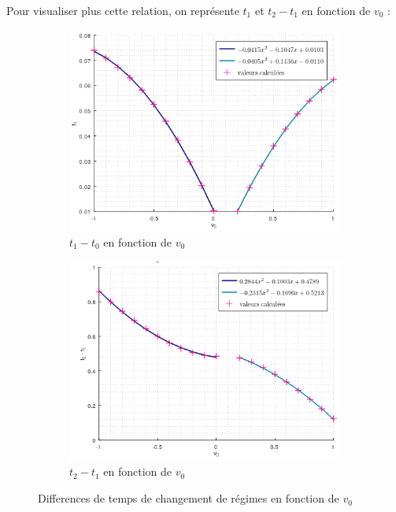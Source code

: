 \documentclass{article}
\begin{document}
Pour visualiser plus cette relation, on représente $t_1$ et $t_2 - t_1$ en fonction de $v_0$ :

\begin{figure}[h!]
  \centering
  \begin{subfigure}[b]{.4\textwidth}
    \includegraphics[width = \linewidth]{t_1.png}
    \caption*{$t_1-t_0$ en fonction de $v_0$}
  \end{subfigure}
  \hspace{1cm}
  \begin{subfigure}[b]{.4\textwidth}
    \includegraphics[width = \linewidth]{t_2-t_1.png}
    \caption*{$t_2-t_1$ en fonction de $v_0$}
  \end{subfigure}
  \caption{Differences de temps de changement de régimes en fonction de $v_0$}
\end{figure}
\end{document}

